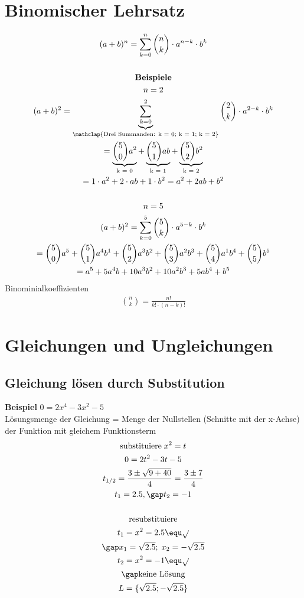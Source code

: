 \section{Binomischer Lehrsatz}
\begin{gather*}
  (a + b)^n = \sum_{k=0}^n \binom{n}{k} \cdot a^{n-k} \cdot b^k \\\\
  \textbf{Beispiele} \\
  n = 2 \\
  (a + b)^2 = \underbrace{\sum_{k=0}^2}_{\mathclap{\text{Drei Summanden: k = 0; k = 1; k = 2}}} \binom{2}{k} \cdot a^{2-k} \cdot b^k \\
  = \underbrace{\binom{5}{0}a^2}_{\text{k = 0}} + \underbrace{\binom{5}{1}ab}_{\text{k = 1}} + \underbrace{\binom{5}{2}b^2}_{\text{k = 2}} \\
  = 1 \cdot a^2 + 2 \cdot ab + 1 \cdot b^2 = a^2 + 2ab + b^2 \\\\
  n = 5 \\
  (a + b)^2 = \sum_{k=0}^5 \binom{5}{k} \cdot a^{5-k} \cdot b^k \\
  = \binom{5}{0}a^5 + \binom{5}{1}a^4b^{1} + \binom{5}{2}a^3b^2 + \binom{5}{3}a^2b^3 + \binom{5}{4}a^{1}b^4 + \binom{5}{5}b^5 \\
  = a^5 + 5a^4b + 10a^3b^2 + 10a^2b^3 + 5ab^4 + b^5
\end{gather*}
Binominialkoeffizienten
\begin{gather*}
  \binom{n}{k} = \frac{n!}{k! \cdot (n - k)!}
\end{gather*}
\section{Gleichungen und Ungleichungen}
\subsection{Gleichung lösen durch Substitution}
\textbf{Beispiel} $ 0 = 2x^4 - 3x^2 - 5 $ \\
Lösungsmenge der Gleichung = Menge der Nullstellen (Schnitte mit der x-Achse) der Funktion mit gleichem Funktionsterm \\
\begin{gather*}
  \text{substituiere} \; x^2 = t \\
  0 = 2t^2 - 3t - 5 \\
  t_{1/2} = \frac{3 \pm \sqrt{9 + 40}}{4} = \frac{3 \pm 7}{4} \\
  t_1 = 2.5, \gap t_2 = -1 \\\\
  \text{resubstituiere} \\
  t_1 = x^2 = 2.5 \equ \sqrt{} \\
  \gap x_1 = \sqrt{2.5}; \; x_2 = -\sqrt{2.5} \\
  t_2 = x^2 = -1 \equ \sqrt{} \\
  \gap \text{keine Lösung} \\
  L = \{\sqrt{2.5}; -\sqrt{2.5}\}
\end{gather*}
